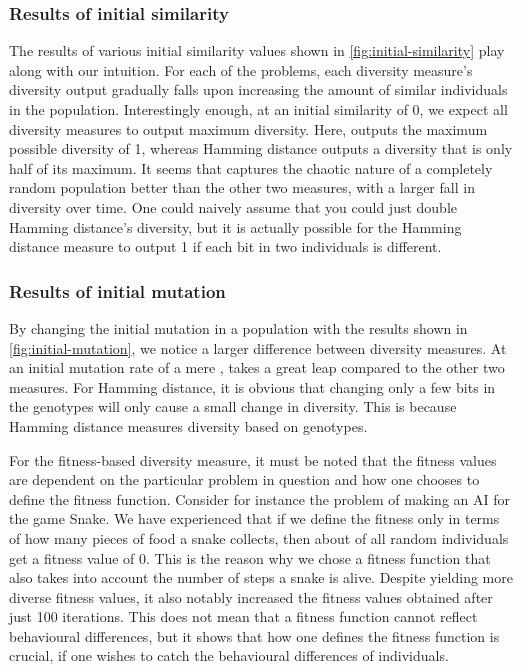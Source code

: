 \subsubsection{Results of initial similarity} The results of various initial similarity values shown in \cref{fig:initial-similarity} play along with our intuition. For each of the problems, each diversity measure's diversity output gradually falls upon increasing the amount of similar individuals in the population. Interestingly enough, at an initial similarity of 0, we expect all diversity measures to output maximum diversity. Here, \dia{} outputs the maximum possible diversity of 1, whereas Hamming distance outputs a diversity that is only half of its maximum. It seems that \dia{} captures the chaotic nature of a completely random population better than the other two measures, with a larger fall in diversity over time. One could naively assume that you could just double Hamming distance's diversity, but it is actually possible for the Hamming distance measure to output 1 if each bit in two individuals is different.
%

%
\subsubsection{Results of initial mutation} By changing the initial mutation in a population with the results shown in \cref{fig:initial-mutation}, we notice a larger difference between diversity measures. At an initial mutation rate of a mere , \dia{} takes a great leap compared to the other two measures. For Hamming distance, it is obvious that changing only a few bits in the genotypes will only cause a small change in diversity. This is because Hamming distance measures diversity based on genotypes.

For the fitness-based diversity measure, it must be noted that the fitness values are dependent on the particular problem in question and how one chooses to define the fitness function. Consider for instance the problem of making an AI for the game Snake. We have experienced that if we define the fitness only in terms of how many pieces of food a snake collects, then about  of all random individuals get a fitness value of 0. This is the reason why we chose a fitness function that also takes into account the number of steps a snake is alive. Despite yielding more diverse fitness values, it also notably increased the fitness values obtained after just 100 iterations. This does not mean that a fitness function cannot reflect behavioural differences, but it shows that how one defines the fitness function is crucial, if one wishes to catch the behavioural differences of individuals.
%

